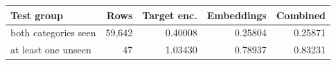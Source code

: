 \begin{center}\small
\begin{tabular}{lrrrr}
\toprule
Test group & Rows & Target enc. & Embeddings & Combined \\
\midrule
both categories seen & 59,642 & 0.40008 & 0.25804 & 0.25871 \\
at least one unseen & 47 & 1.03430 & 0.78937 & 0.83231 \\
\bottomrule
\end{tabular}\end{center}
